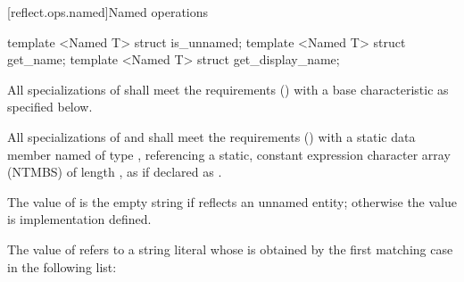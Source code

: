 [reflect.ops.named]{Named operations}

\begin{std.txt}\color{addclr}

\begin{itemdecl}
template <Named T> struct is_unnamed;
template <Named T> struct get_name;
template <Named T> struct get_display_name;
\end{itemdecl}

\begin{itemdescr}
\pnum
All specializations of  shall meet the  requirements () with a base characteristic as specified below.

\pnum
All specializations of  and  shall meet the  requirements () with a static data member named  of type , referencing a static, constant expression character array (NTMBS) of length , as if declared as .

\pnum
The value of  is the empty string if  reflects an unnamed entity; otherwise the value is implementation defined.

\pnum
The value of  refers to a string literal whose  is obtained by the first matching case in the following list:


\end{itemdescr}
\end{std.txt}
